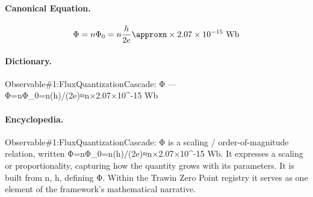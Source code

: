 \paragraph{Canonical Equation.}
\[
\Phi=n\Phi_0=n\frac{h}{2e}\approxn\times2.07\times10^{-15}\text{ Wb}
\]

\paragraph{Dictionary.}
Observable\#1:FluxQuantizationCascade: Φ — Φ=nΦ\_0=n(h)/(2e)≈n×2.07×10\textasciicircum{}-15 Wb

\paragraph{Encyclopedia.}
Observable\#1:FluxQuantizationCascade: Φ is a scaling / order-of-magnitude relation, written Φ=nΦ\_0=n(h)/(2e)≈n×2.07×10\textasciicircum{}-15 Wb. It expresses a scaling or proportionality, capturing how the quantity grows with its parameters. It is built from n, h, defining Φ. Within the Trawin Zero Point registry it serves as one element of the framework's mathematical narrative.
